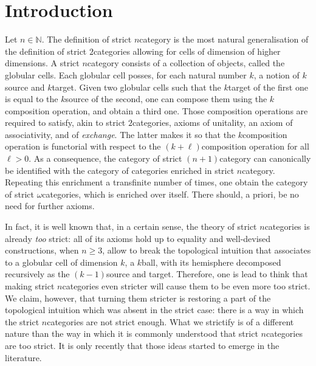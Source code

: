 \section{Introduction}

Let \( n \in \mathbb{N} \).
The definition of strict \( n \)\nbd category is the most natural generalisation of the definition of strict \( 2 \)\nbd categories allowing for cells of dimension of higher dimensions.
A strict \( n \)\nbd category consists of a collection of objects, called the globular cells.
Each globular cell posses, for each natural number \( k \), a notion of \( k \)\nbd source and \( k \)\nbd target. 
Given two globular cells such that the \( k \)\nbd target of the first one is equal to the \( k \)\nbd source of the second, one can compose them using the \( k \)\nbd composition operation, and obtain a third one.
Those composition operations are required to satisfy, akin to strict \( 2 \)\nbd categories, axioms of unitality, an axiom of associativity, and of \emph{exchange}.
The latter makes it so that the \( k \)\nbd composition operation is functorial with respect to the \( (k + \ell) \)\nbd composition operation for all \( \ell > 0 \).
As a consequence, the category of strict \( (n + 1) \)\nbd category can canonically be identified with the category of categories enriched in strict \( n \)\nbd category. 
Repeating this enrichment a transfinite number of times, one obtain the category of strict \( \omega \)\nbd categories, which is enriched over itself.
There should, a priori, be no need for further axioms.   

In fact, it is well known that, in a certain sense, the theory of strict \( n \)\nbd categories is already \emph{too} strict: all of its axioms hold up to equality and well-devised constructions, when \( n \geq 3 \), allow to break the topological intuition that associates to a globular cell of dimension \( k \), a \( k \)\nbd ball, with its hemisphere decomposed recursively as the \( (k - 1) \)\nbd source and target.
Therefore, one is lead to think that making strict \( n \)\nbd categories even stricter will cause them to be even more too strict.
We claim, however, that turning them stricter is restoring a part of the topological intuition which was absent in the strict case: there is a way in which the strict \( n \)\nbd categories are not strict enough.
What we strictify is of a different nature than the way in which it is commonly understood that strict \( n \)\nbd categories are too strict.
It is only recently that those ideas started to emerge in the literature.

